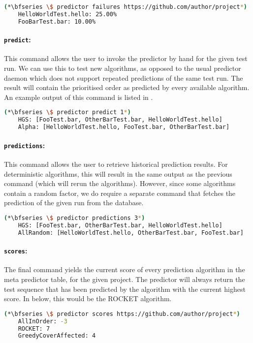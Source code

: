\begin{lstlisting}[language=bash, caption=Output of the failures-command., label=lst:analysis-failures]
	(*\bfseries \$ predictor failures https://github.com/author/project*)
	HelloWorldTest.hello: 25.00%
	FooBarTest.bar: 10.00%
\end{lstlisting}

\paragraph*{\texttt{predict}:} This command allows the user to invoke the predictor by hand for the given test run. We can use this to test new algorithms, as opposed to the usual predictor daemon which does not support repeated predictions of the same test run. The result will contain the prioritised order as predicted by every available algorithm. An example output of this command is listed in .

\begin{lstlisting}[language=bash, caption=Output of the predict-command., label=lst:analysis-predict]
	(*\bfseries \$ predictor predict 1*)
	HGS: [FooTest.bar, OtherBarTest.bar, HelloWorldTest.hello]
	Alpha: [HelloWorldTest.hello, FooTest.bar, OtherBarTest.bar]
\end{lstlisting}

\paragraph*{\texttt{predictions}:} This command allows the user to retrieve historical prediction results. For deterministic algorithms,  this will result in the same output as the previous command (which will rerun the algorithms). However, since some algorithms contain a random factor, we do require a separate command that fetches the prediction of the given run from the database.

\begin{lstlisting}[language=bash, caption=Output of the predictions-command., label=lst:analysis-predictions]
	(*\bfseries \$ predictor predictions 3*)
	HGS: [FooTest.bar, OtherBarTest.bar, HelloWorldTest.hello]
	AllRandom: [HelloWorldTest.hello, OtherBarTest.bar, FooTest.bar]
\end{lstlisting}
	
\paragraph*{\texttt{scores}:} The final command yields the current score of every prediction algorithm in the meta predictor table, for the given project. The predictor will always return the test sequence that has been predicted by the algorithm with the current highest score. In  below, this would be the ROCKET algorithm.
	
\begin{lstlisting}[language=bash, caption=Output of the scores-command., label=lst:analysis-scores]
	(*\bfseries \$ predictor scores https://github.com/author/project*)
	AllInOrder: -3
	ROCKET: 7
	GreedyCoverAffected: 4
\end{lstlisting}